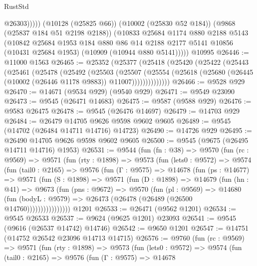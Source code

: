 \begin{lexlean}{RustStd}
\begin{coremodule}
                @26303)))))
      (@10128 (@25825 @66))
      (@10002 (@25830 @52 @184))
      (@9868 (@25837 @184 @51 @2198 @2188))
      (@10833
        @25684
        @1174
        @880
        @2188
        @5143
        (@10842
          @25684
          @1953
          @184
          @880
          @86
          @14
          @2188
          @2177
          @5141
          @10856
          (@10431 @25684 @1953)
          (@10909 (@10944 @880 @5141)))))
    @10995
@26446 := @11000 @1563
@26465 := @25352
    (@25377
      (@25418
        (@25420
          (@25422
            (@25443
              (@25461
                (@25478
                  (@25492
                    (@25503
                      (@25507
                        (@25554
                          (@25618 (@25680 (@26445 (@10002 (@26446 @1178 @9883)) @11007))))))))))))))
@26466 := @9528 @929
@26470 := @14671 (@9534 @929) (@9540 @929)
@26471 := @9549 @23090
@26473 := @9545 (@26471 @14683)
@26475 := @9587 (@9588 @929)
@26476 := @9583 @26475
@26478 := @9545 (@26476 @14697)
@26479 := @14703 @929
@26484 := @26479 @14705 @9626 @9598 @9602 @9605
@26489 := @9545 (@14702 (@26484 @14711 @14716) @14723)
@26490 := @14726 @929
@26495 := @26490 @14705 @9626 @9598 @9602 @9605
@26500 := @9545 (@9675 (@26495 @14711 @14716) @1953)
@26531 := @9544
    (fun (fn : @38) =>
    @9570
      (fun (rc : @9569) =>
      @9571
        (fun (rty : @1898) =>
        @9573
          (fun (lets0 : @9572) =>
          @9574
            (fun (tail0 : @2165) =>
            @9576
              (fun (Γ : @9575) =>
              @14678
                (fun (ps : @14677) =>
                @9571
                  (fun (S : @1898) =>
                  @9571
                    (fun (D : @1898) =>
                    @14679
                      (fun (hn : @41) =>
                      @9673
                        (fun (pns : @9672) =>
                        @9570
                          (fun (pl : @9569) =>
                          @14680
                            (fun (bodyL : @9579) =>
                            @26473 (@26478 (@26489 (@26500 @14760))))))))))))))))
    @1201
@26533 := @26471 (@9562 @1201)
@26534 := @9545 @26533
@26537 := @9624 (@9625 @1201) @23093
@26541 := @9545 (@9616 (@26537 @14742) @14746)
@26542 := @9650 @1201
@26547 := @14751 (@14752 @26542 @23096 @14713 @14715)
@26576 := @9760
    (fun (rc : @9569) =>
    @9571
      (fun (rty : @1898) =>
      @9573
        (fun (lets0 : @9572) =>
        @9574
          (fun (tail0 : @2165) =>
          @9576
            (fun (Γ : @9575) =>
            @14678

\end{coremodule}
\end{lexlean}
